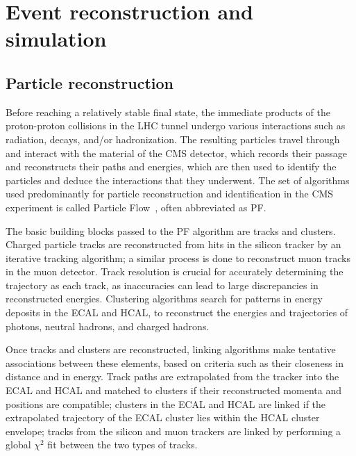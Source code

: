 \chapter{Event reconstruction and simulation\label{sec:recosim}}

\section{Particle reconstruction\label{sec:cms-reco}}
Before reaching a relatively stable final state, the immediate products of the proton-proton collisions in the LHC tunnel undergo various interactions such as radiation, decays, and/or hadronization. The resulting particles travel through and interact with the material of the CMS detector, which records their passage and reconstructs their paths and energies, which are then used to identify the particles and deduce the interactions that they underwent. The set of algorithms used predominantly for particle reconstruction and identification in the CMS experiment is called Particle Flow~\cite{CMS-PAS-PFT-09-001}, often abbreviated as PF.

The basic building blocks passed to the PF algorithm are tracks and clusters. Charged particle tracks are reconstructed from hits in the silicon tracker by an iterative tracking algorithm; a similar process is done to reconstruct muon tracks in the muon detector. Track resolution is crucial for accurately determining the trajectory as each track, as inaccuracies can lead to large discrepancies in reconstructed energies. Clustering algorithms search for patterns in energy deposits in the ECAL and HCAL, to reconstruct the energies and trajectories of photons, neutral hadrons, and charged hadrons.

Once tracks and clusters are reconstructed, linking algorithms make tentative associations between these elements, based on criteria such as their closeness in distance and in energy. Track paths are extrapolated from the tracker into the ECAL and HCAL and matched to clusters if their reconstructed momenta and positions are compatible; clusters in the ECAL and HCAL are linked if the extrapolated trajectory of the ECAL cluster lies within the HCAL cluster envelope; tracks from the silicon and muon trackers are linked by performing a global $\chi^2$ fit between the two types of tracks.

